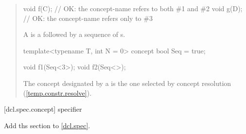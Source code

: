 \begin{quote}
\begin{codeblock}
void f(C); // OK: the concept-name  refers to both \#1 and \#2
void g(D); // OK: the concept-name  refers only to \#3
\end{codeblock}
\exitexample

\pnum
A  is a  followed 
by a sequence of s.
%
\enterexample
\begin{codeblock}
template<typename T, int N = 0> concept bool Seq = true;

void f1(Seq<3>);
void f2(Seq<>);
\end{codeblock}
\exitexample

\pnum
The concept designated by a 
is the one selected by concept resolution (\ref{temp.constr.resolve}).

\end{quote}

[dcl.spec.concept]{ specifier}

Add ths section to \ref{dcl.spec}.

